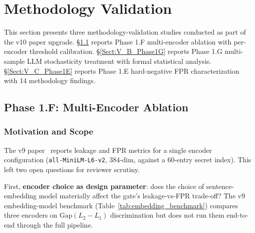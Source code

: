 \documentclass[journal]{IEEEtran}
\begin{document}

\section{Methodology Validation}
\label{Sect:Methodology_Validation}

This section presents three methodology-validation studies conducted as part of the v10 paper upgrade. \S\ref{Sect:V_A_Phase1F} reports Phase 1.F multi-encoder ablation with per-encoder threshold calibration. \S\ref{Sect:V_B_Phase1G} reports Phase 1.G multi-sample LLM stochasticity treatment with formal statistical analysis. \S\ref{Sect:V_C_Phase1E} reports Phase 1.E hard-negative FPR characterization with 14 methodology findings.

\subsection{Phase 1.F: Multi-Encoder Ablation}
\label{Sect:V_A_Phase1F}


\subsubsection{Motivation and Scope}
\label{Sect:V_A_1_Motivation}

The v9 paper~\cite{sentinelflow_v9} reports leakage and FPR metrics for a single encoder configuration (\texttt{all-MiniLM-L6-v2}, 384-dim, against a 60-entry secret index). This left two open questions for reviewer scrutiny.

First, \textbf{encoder choice as design parameter}: does the choice of sentence-embedding model materially affect the gate's leakage-vs-FPR trade-off? The v9 embedding-model benchmark (Table~\ref{tab:embedding_benchmark}) compares three encoders on $\text{Gap}(L_2{-}L_1)$ discrimination but does not run them end-to-end through the full pipeline.
\end{document}
